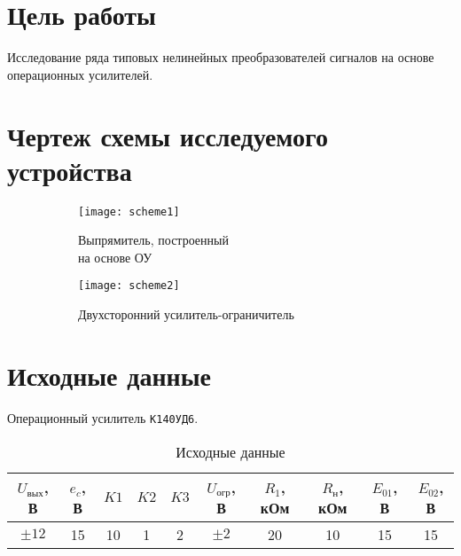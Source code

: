 





\section{Цель работы}

Исследование ряда типовых нелинейных преобразователей сигналов на основе операционных усилителей.

\section{Чертеж схемы исследуемого устройства}

\begin{figure}[H]
\begin{center}
	\begin{subfigure}[b]{0.45\textwidth}
		\texttt{[image: scheme1]}
		\caption{Выпрямитель, построенный \\на основе ОУ}
	\end{subfigure}
	\begin{subfigure}[b]{0.45\textwidth}
		\texttt{[image: scheme2]}
		\caption{Двухсторонний усилитель-ограничитель}
	\end{subfigure}
	\caption{}
\end{center}
\end{figure}


\section{Исходные данные}

Операционный усилитель \verb+К140УД6+.

\begin{table}[H]
\begin{center}
	\caption{Исходные данные}
	\def\tabcolsep{6pt}
	\begin{tabular}{|c|c|c|c|c|c|c|c|c|c|}
		\hline
		$U_\text{вых}$, В &
		$e_c$, В &
		$K1$ &
		$K2$ &
		$K3$ &
		$U_\text{огр}$, В &
		$R_1$, кОм &
		$R_{\text{н}}$, кОм &
		$E_{01}$, В &
		$E_{02}$, В \\
		\hline
		$\pm12$ &
		15 &
		10 &
		1 &
		2 &
		$\pm2$ &
		20 &
		10 &
		15 &
		15 \\
	    \hline	
	\end{tabular}
\end{center}
\end{table}

